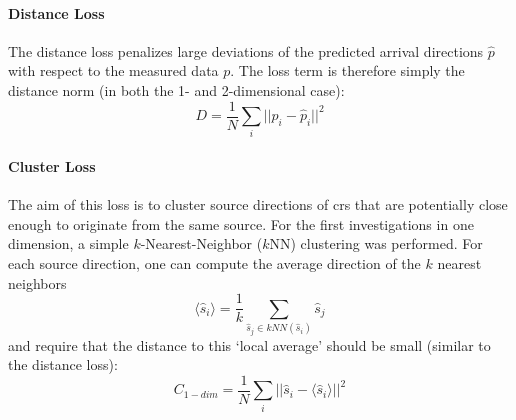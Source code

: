 \paragraph{Distance Loss}

The distance loss penalizes large deviations of the predicted arrival directions \(\hat p\) with respect to the measured data \(p\). The loss term is therefore simply the distance norm (in both the 1- and 2-dimensional case):
\begin{equation}
    D = \frac1N \sum_i {||p_i - \hat p_i ||}^2
\end{equation}

\paragraph{Cluster Loss}

The aim of this loss is to cluster source directions of \glspl{cr} that are potentially close enough to originate from the same source. For the first investigations in one dimension, a simple \(k\)-Nearest-Neighbor (\(k\)NN) clustering was performed. For each source direction, one can compute the average direction of the \(k\) nearest neighbors
\begin{equation}
    \langle \hat s_i \rangle = \frac1k \sum_{\hat s_j \in kNN(\hat s_i)} \hat s_j
\end{equation}
and require that the distance to this `local average' should be small (similar to the distance loss):
\begin{equation}
    C_{1-dim} = \frac1N \sum_i {|| \hat s_i - \langle \hat s_i \rangle ||}^2 %
\end{equation}

